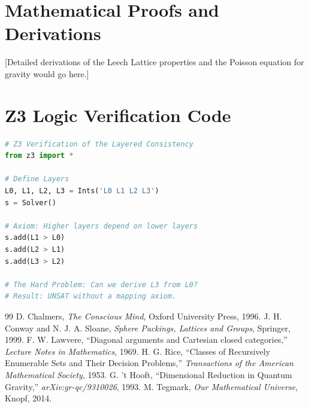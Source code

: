 \documentclass[11pt,onecolumn]{article}
\begin{document}
\appendix
\section{Mathematical Proofs and Derivations}
[Detailed derivations of the Leech Lattice properties and the Poisson equation for gravity would go here.]

\section{Z3 Logic Verification Code}
\begin{lstlisting}[language=Python]
# Z3 Verification of the Layered Consistency
from z3 import *

# Define Layers
L0, L1, L2, L3 = Ints('L0 L1 L2 L3')
s = Solver()

# Axiom: Higher layers depend on lower layers
s.add(L1 > L0)
s.add(L2 > L1)
s.add(L3 > L2)

# The Hard Problem: Can we derive L3 from L0?
# Result: UNSAT without a mapping axiom.
\end{lstlisting}

\begin{thebibliography}{99}
 D. Chalmers, \textit{The Conscious Mind}, Oxford University Press, 1996.
 J. H. Conway and N. J. A. Sloane, \textit{Sphere Packings, Lattices and Groups}, Springer, 1999.
 F. W. Lawvere, ``Diagonal arguments and Cartesian closed categories,'' \textit{Lecture Notes in Mathematics}, 1969.
 H. G. Rice, ``Classes of Recursively Enumerable Sets and Their Decision Problems,'' \textit{Transactions of the American Mathematical Society}, 1953.
 G. 't Hooft, ``Dimensional Reduction in Quantum Gravity,'' \textit{arXiv:gr-qc/9310026}, 1993.
 M. Tegmark, \textit{Our Mathematical Universe}, Knopf, 2014.
\end{thebibliography}
\end{document}
